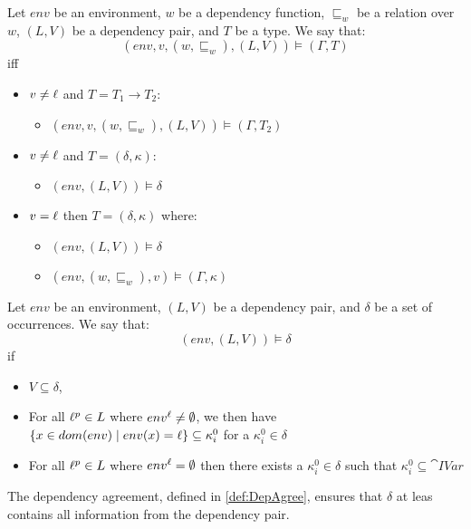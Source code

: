 \documentclass[acmsmall,sigplan]{acmart}
\begin{document}
\begin{definition}\label{def:TAgree}
	Let $env$ be an environment, $w$ be a dependency function, $\sqsubseteq_w$ be a relation over $w$, $(L,V)$ be a dependency pair, and $T$ be a type.
	We say that:
	$$(env,v,(w,\sqsubseteq_w),(L,V))\models(\Gamma,T)$$
	iff
	\begin{itemize}
		\item $v\neq\ell$ and $T=T_1\rightarrow T_2$:
		\begin{itemize}
			\item $(env,v,(w,\sqsubseteq_w),(L,V))\models(\Gamma,T_2)$
		\end{itemize}

		\item $v\neq\ell$ and $T=(\delta,\kappa)$:
		\begin{itemize}
			\item $(env,(L,V))\models\delta$
		\end{itemize}

		\item $v=\ell$ then $T=(\delta,\kappa)$ where:
		\begin{itemize}
			\item $(env,(L,V))\models\delta$
			\item $(env,(w,\sqsubseteq_w),v)\models(\Gamma,\kappa)$
		\end{itemize}
	\end{itemize}
\end{definition}

\begin{definition}\label{def:DepAgree}
	Let $env$ be an environment, $(L,V)$ be a dependency pair, and $\delta$ be a set of occurrences.
	We say that:
	$$(env,(L,V))\models\delta$$
	if
	\begin{itemize}
		\item $V\subseteq\delta$,
		\item For all $\ell^p\in L$ where $env^{\ell}\neq\emptyset$, we then have $\{x\in dom(env)\mid env(x)=\ell\}\subseteq \kappa_i^0$ for a $\kappa_i^0\in\delta$
		\item For all $\ell^p\in L$ where $env^{\ell}=\emptyset$ then there exists a $\kappa_i^0\in\delta$ such that $\kappa_i^0\subseteq\cat{IVar}$
	\end{itemize}
\end{definition}

The dependency agreement, defined in \cref{def:DepAgree}, ensures that $\delta$ at leas contains all information from the dependency pair.
\end{document}
